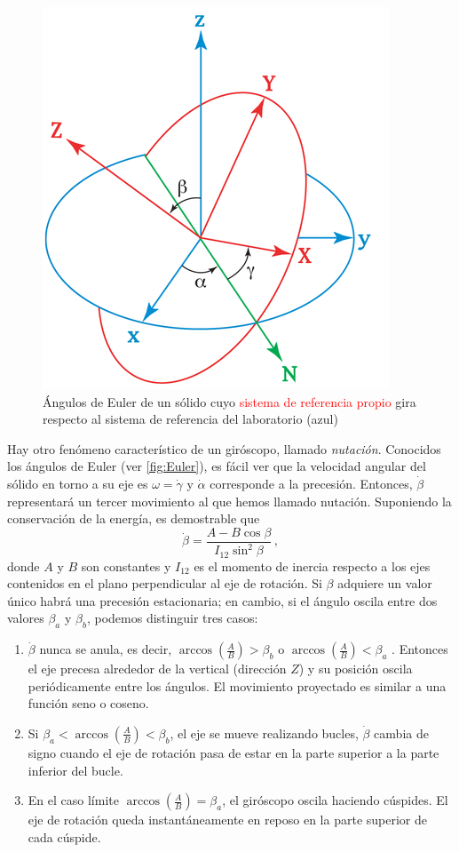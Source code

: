 \documentclass[a4paper]{article}
\begin{document}
\begin{figure}
\begin{center}
\includegraphics[width=8 cm]{euler.png}
\caption{Ángulos de Euler de un sólido cuyo \textcolor{red}{sistema de referencia propio} gira respecto al \textcolor{blue!70!cyan!85!white}{sistema de referencia del laboratorio} (azul)}
\label{fig:Euler}
\end{center}
\end{figure}

Hay otro fenómeno característico de un giróscopo, llamado \textit{nutación}. Conocidos los ángulos de Euler (ver \autoref{fig:Euler}), es fácil ver que la velocidad angular del sólido en torno a su eje es $\omega=\dot{\gamma}$ y $\dot{\alpha}$ corresponde a la precesión. Entonces, $\dot{\beta}$ representará un tercer movimiento al que hemos llamado nutación. Suponiendo la conservación de la energía, es demostrable que 
\begin{equation}
\label{eq:nutacion}
\dot{\beta}=\frac{A-B\cos\beta}{I_{12}\sin^2\beta}\, ,
\end{equation}
donde $A$ y $B$ son constantes y $I_{12}$ es el momento de inercia respecto a los ejes contenidos en el plano perpendicular al eje de rotación. Si $\beta$ adquiere un valor único habrá una precesión estacionaria; en cambio, si el ángulo oscila entre dos valores $\beta_a$ y $\beta_b$, podemos distinguir tres casos:
\begin{enumerate}
\item $\dot{\beta}$ nunca se anula, es decir, $\arccos\left(\frac{A}{B}\right)>\beta_b$ o $\arccos\left(\frac{A}{B}\right)<\beta_a$ . Entonces el eje precesa alrededor de la vertical (dirección $Z$) y su posición oscila periódicamente entre los ángulos. El movimiento proyectado es similar a una función seno o coseno.
\item Si $\beta_a<\arccos\left(\frac{A}{B}\right)<\beta_b$, el eje se mueve realizando bucles, $\dot{\beta}$ cambia de signo cuando el eje de rotación pasa de estar en la parte superior a la parte inferior del bucle.
\item En el caso límite $\arccos\left(\frac{A}{B}\right)=\beta_a$, el giróscopo oscila haciendo cúspides. El eje de rotación queda instantáneamente en reposo en la parte superior de cada cúspide.
\end{enumerate}
\end{document}
